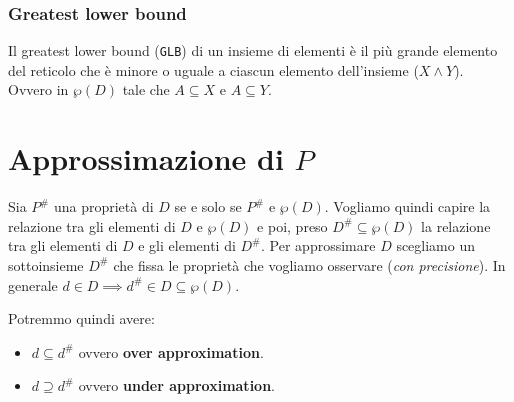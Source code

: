 \subsubsection{Greatest lower bound}
Il greatest lower bound (\verb|GLB|) di un insieme di elementi è il più grande
elemento del reticolo che è minore o uguale a ciascun elemento dell'insieme ($X \land Y$).
Ovvero in $\wp(D)$ tale che $A \subseteq X$ e $A \subseteq Y$.
\begin{figure}[H]
  \centering
\end{figure}
\section{Approssimazione di $P$}
Sia $P^\#$ una proprietà di $D$ se e solo se $P^\#$ e $\wp(D)$. Vogliamo quindi capire la relazione tra gli 
elementi di $D$ e $\wp(D)$ e poi, preso $D^\# \subseteq \wp(D)$ la relazione tra gli elementi di $D$ e gli elementi 
di $D^\#$.
Per approssimare $D$ scegliamo un sottoinsieme $D^\#$ che fissa le proprietà che vogliamo osservare (\textit{con precisione}).
In generale $d \in D \implies d^\# \in D \subseteq \wp(D)$.

Potremmo quindi avere:
\begin{itemize}
  \item $d \subseteq d^\#$ ovvero \textbf{over approximation}.
  \item $d \supseteq d^\#$ ovvero \textbf{under approximation}.
\end{itemize}
